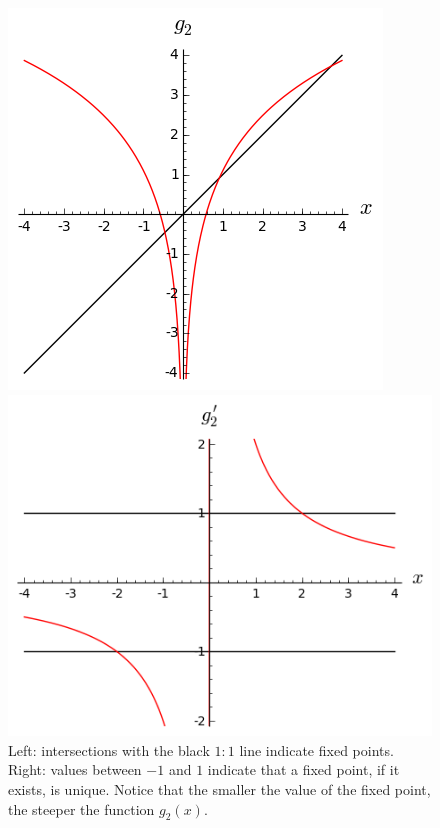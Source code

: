 \documentclass[11pt]{article}
\begin{document}
\begin{figure}[ht!]
\begin{minipage}{0.48\textwidth}
\includegraphics[width=\textwidth]{1_basics/g2.png}
\end{minipage}
\begin{minipage}{0.48\textwidth}
\includegraphics[width=\textwidth]{1_basics/g2p.png}
\end{minipage}
\caption{Left: intersections with the black \(1:1\) line indicate fixed points. Right: values between \(-1\) and \(1\) indicate that a fixed point, if it exists, is unique. Notice that the smaller the value of the fixed point, the steeper the function \(g_2(x)\).}\label{fig::g2}
\end{figure}
\end{document}
